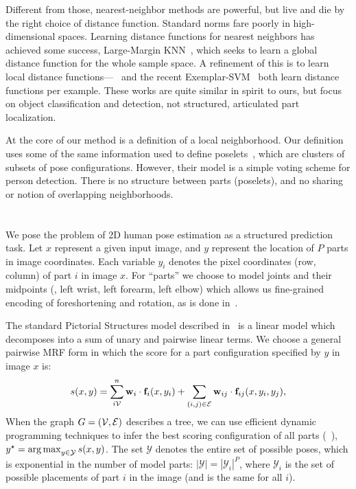 Different from those, nearest-neighbor methods are powerful, but live and die 
by the right choice of distance function.  Standard norms fare poorly in 
high-dimensional spaces.  Learning distance functions for nearest neighbors has 
achieved some success, \eg Large-Margin KNN~\citep{lmknn}, which seeks to learn 
a global distance function for the whole sample space.  A refinement of this is 
to learn local distance functions---~\citep{frome07} and the recent 
Exemplar-SVM~\citep{esvm} both learn distance functions per example.  These 
works are quite similar in spirit to ours, but focus on object classification 
and detection, not structured, articulated part localization.

At the core of our method is a definition of a local neighborhood.  Our 
definition uses some of the same information used to define 
poselets~\citep{bourdev09}, which are clusters of subsets of pose 
configurations.  However, their model is a simple voting scheme for person 
detection.  There is no structure between parts (poselets), and no sharing or 
notion of overlapping neighborhoods.



\section{\LLPS}\label{sec:llps-model}

We pose the problem of 2D human pose estimation as a structured prediction 
task.  Let $x$ represent a given input image, and $y$ represent the location of 
$P$ parts in image coordinates.  Each variable $y_i$ denotes the pixel 
coordinates (row, column) of part $i$ in image $x$.  For ``parts'' we choose to 
model joints and their midpoints (\eg, left wrist, left forearm, left elbow) 
which allows us fine-grained encoding of foreshortening and rotation, as is 
done in~\citep{deva2011,sapp2011}.

The standard Pictorial Structures model described in~ is a linear 
model which decomposes into a sum of unary and pairwise linear terms.  We 
choose a general pairwise MRF form in which the score for a part configuration 
specified by $y$ in image $x$ is:
\begin{align}
 s(x,y) = \sum_{i \mathcal{V}}^n \mathbf{w}_i \cdot \mathbf{f}_i(x,y_i) + \sum_{(i,j) \in \mathcal{E}} \mathbf{w}_{ij} 
\cdot \mathbf{f}_{ij}(x,y_i,y_j),
 \label{eq:llps-ps}
\end{align}
When the graph $G = (\mathcal{V},\mathcal{E})$ describes a tree, we can use efficient dynamic 
programming techniques to infer the best scoring configuration of all parts 
(~), $y^\star = \mathop{\arg\max}_{y \in \mathcal{Y}} s(x,y)$.
The set $\mathcal{Y}$ denotes the entire set of possible poses, which is 
exponential in the number of model parts: $|\mathcal{Y}| = |\mathcal{Y}_i|^P$, 
where $\mathcal{Y}_i$ is the set of possible placements of part $i$ in the 
image (and is the same for all $i$).


